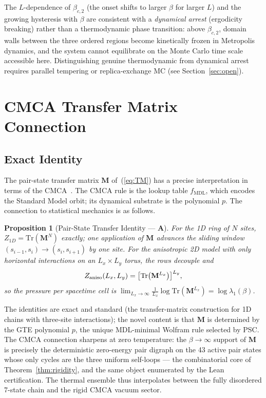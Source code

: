 \documentclass[11pt]{article}
\newtheorem{proposition}[theorem]{Proposition}
\theoremstyle{remark}
\newcommand{\fmdl}{\ensuremath{f_{\mathrm{MDL}}}}
\newcommand{\CatA}{\textbf{A}}
\begin{document}
The $L$-dependence of $\beta_{c,2}$ (the onset shifts to larger $\beta$ for larger
$L$) and the growing hysteresis with $\beta$ are consistent with a \emph{dynamical
arrest} (ergodicity breaking) rather than a thermodynamic phase transition: above
$\beta_{c,2}$, domain walls between the three ordered regions become kinetically
frozen in Metropolis dynamics, and the system cannot equilibrate on the Monte Carlo
time scale accessible here. Distinguishing genuine thermodynamic from dynamical
arrest requires parallel tempering or replica-exchange MC (see Section~\ref{sec:open}).

\section{CMCA Transfer Matrix Connection}
\label{sec:cmca}

\subsection{Exact Identity}

The pair-state transfer matrix $\mathbf{M}$ of~(\ref{eq:TM}) has a precise
interpretation in terms of the
CMCA~\cite{SpivackCMCA, SpivackThreeTapeCMCA}. The CMCA rule is
the lookup table $\fmdl{}$, which encodes the Standard Model orbit; its
dynamical substrate is the polynomial $p$. The connection to statistical
mechanics is as follows.

\begin{proposition}[Pair-State Transfer Identity --- \CatA{}]
\label{prop:tm-cmca}
For the 1D ring of $N$ sites, $Z_{1D} = \mathrm{Tr}(\mathbf{M}^N)$ exactly;
one application of $\mathbf{M}$ advances the sliding window
$(s_{i-1}, s_i) \to (s_i, s_{i+1})$ by one site. For the anisotropic 2D model
with only horizontal interactions on an $L_x \times L_y$ torus, the rows
decouple and
\begin{equation}\label{eq:Z-CMCA}
  Z_{\rm aniso}(L_x, L_y) = \bigl[\mathrm{Tr}\bigl(\mathbf{M}^{L_x}\bigr)\bigr]^{L_y},
\end{equation}
so the pressure per spacetime cell is
$\lim_{L_x \to \infty} \tfrac{1}{L_x}\log \mathrm{Tr}(\mathbf{M}^{L_x}) =
\log \lambda_1(\beta)$.
\end{proposition}

The identities are exact and standard (the transfer-matrix construction for
1D chains with three-site interactions); the novel content is that $\mathbf{M}$
is determined by the GTE polynomial $p$, the unique MDL-minimal Wolfram rule
selected by PSC. The CMCA connection sharpens at zero temperature: the
$\beta \to \infty$ support of $\mathbf{M}$ is precisely the deterministic
zero-energy pair digraph on the 43 active pair states whose only cycles are the
three uniform self-loops --- the combinatorial core of
Theorem~\ref{thm:rigidity}, and the same object enumerated by the Lean
certification. The thermal ensemble thus interpolates between the fully
disordered 7-state chain and the rigid CMCA vacuum sector.
\end{document}
